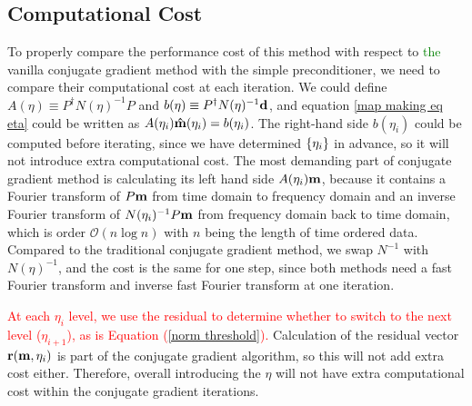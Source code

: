 \documentclass[twocolumn,linenumbers]{aastex631}
\newcommand{\Eq}[1]{\text{Eq.\,\ref{#1}}}
\newcommand{\vbd}{\vb{d}}
\newcommand{\vbm}{\vb{m}}
\newcommand{\inv}[1]{#1^{-1}}
\newcommand{\hatm}{\vb{\hat{m}}}
\newcommand{\Pdagger}{P^{\dagger}}
\newcommand{\kmh}[1]{\textcolor{red}{#1}}
\newcommand{\textgreen}[1]{\textcolor{green}{#1}}
\begin{document}
\subsection{Computational Cost}
To properly compare the performance cost of this method with respect to \textgreen{the} vanilla
conjugate gradient method with {the} simple preconditioner,
we need to compare their computational cost at each iteration.
{
We could define $A(\eta) \equiv \Pdagger \inv{N(\eta)} P$ and $b(\eta) \equiv \Pdagger \inv{N(\eta)} \vbd$,
and equation \ref{map making eq eta} could be written as $A(\eta_i) \hatm(\eta_i) = b(\eta_i)$.  The right-hand side
$b(\eta_i)$ could be computed before iterating,
}
since we have determined $\qty{\eta_i}$ in advance,
so it will not introduce extra computational cost.
The most demanding part of conjugate gradient method is calculating
its left hand side $A(\eta_i) \vbm$, because it contains a Fourier transform of
$P\vbm$ from time domain to frequency domain and an inverse Fourier transform
of $\inv{N(\eta_i)} P \vbm$ from frequency domain back to time domain,
which is order $\mathcal{O}(n\log n)$ with $n$ being the length of time ordered
data.
Compared to the traditional conjugate gradient method,
we swap $\inv{N}$ with $\inv{N(\eta)}$, and the cost is the same for one step,
since both methods need a fast Fourier transform and inverse fast Fourier transform 
at one iteration.


\kmh{
  At each $\eta_i$ level, we use the residual to determine whether to switch to the next level ($\eta_{i+1}$), as  is Equation (\ref{norm threshold}).
}
Calculation of the residual vector $\vb{r}(\vbm,\eta_i)$ is part of the conjugate gradient algorithm,
so this will not add extra cost either.
Therefore, overall introducing the $\eta$ will not have extra computational cost within the conjugate gradient iterations.
\end{document}
